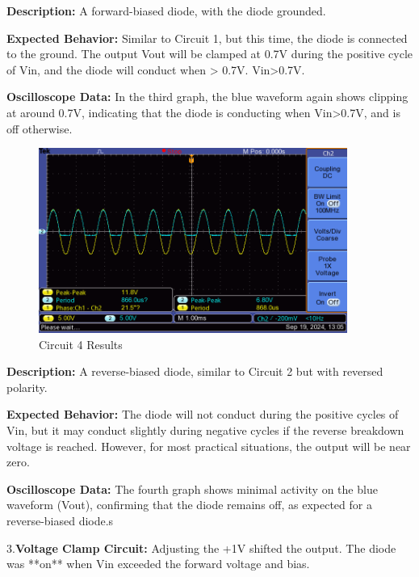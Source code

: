 \documentclass{article}
\begin{document}
\textbf{Description:} A forward-biased diode, with the diode grounded.

\textbf{Expected Behavior:} Similar to Circuit 1, but this time, the diode is connected to the ground. The output 
Vout will be clamped at 0.7V during the positive cycle of 
Vin, and the diode will conduct when > 0.7V. Vin>0.7V. 

\textbf{Oscilloscope Data:} In the third graph, the blue waveform again shows clipping at around 0.7V, indicating that the diode is conducting when 
Vin>0.7V, and is off otherwise.

\begin{figure}[H]
    \centering
    \includegraphics[width=0.9\textwidth]{./img/Lab4_2_4.png}
    \caption{Circuit 4 Results}
    \label{fig:graph6}
\end{figure}

\textbf{Description:} A reverse-biased diode, similar to Circuit 2 but with reversed polarity.

\textbf{Expected Behavior:} The diode will not conduct during the positive cycles of 
Vin, but it may conduct slightly during negative cycles if the reverse breakdown voltage is reached. However, for most practical situations, the output will be near zero.

\textbf{Oscilloscope Data:} The fourth graph shows minimal activity on the blue waveform (Vout), confirming that the diode remains off, as expected for a reverse-biased diode.s
\newline
\newline

3.\textbf{Voltage Clamp Circuit:} Adjusting the +1V shifted the output. The diode was **on** when Vin exceeded the forward voltage and bias.
\end{document}
